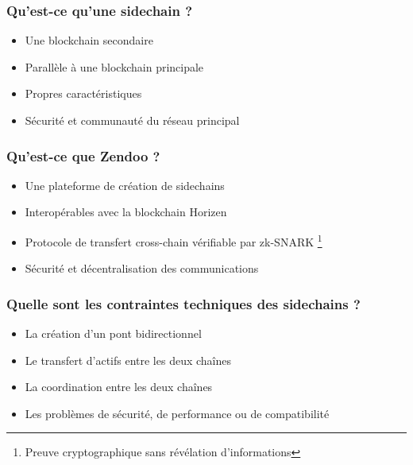 \begin{frame} 
  \frametitle{Qu’est-ce qu’une sidechain ?} 
  \begin{itemize} 
    \item Une blockchain secondaire 
    \item Parallèle à une blockchain principale 
    \item Propres caractéristiques 
    \item Sécurité et communauté du réseau principal 
  \end{itemize} 
\end{frame}

\begin{frame} 
  \frametitle{Qu’est-ce que Zendoo ?} 
  \begin{itemize} 
    \item Une plateforme de création de sidechains 
    \item Interopérables avec la blockchain Horizen 
    \item Protocole de transfert cross-chain vérifiable par zk-SNARK \footnote{Preuve cryptographique sans révélation d’informations} 
    \item Sécurité et décentralisation des communications 
  \end{itemize} 
\end{frame}

\begin{frame} 
  \frametitle{Quelle sont les contraintes techniques des sidechains ?} 
  \begin{itemize} 
    \item La création d’un pont bidirectionnel 
    \item Le transfert d’actifs entre les deux chaînes 
    \item La coordination entre les deux chaînes 
    \item Les problèmes de sécurité, de performance ou de compatibilité 
  \end{itemize} 
\end{frame}